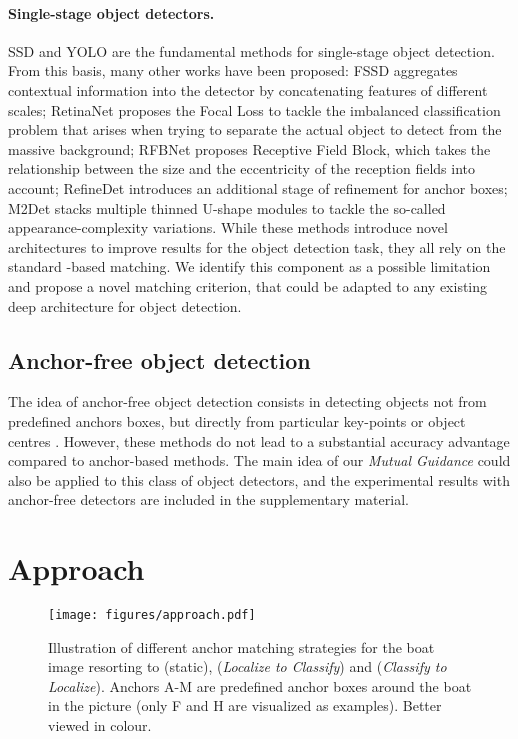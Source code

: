 \documentclass[runningheads]{llncs}
\begin{document}
\paragraph{Single-stage object detectors.}
SSD \cite{SSD} and YOLO \cite{YOLOv1} are the fundamental methods for single-stage object detection. From this basis, many other works have been proposed:
FSSD \cite{FSSD} aggregates contextual information into the detector by concatenating features of different scales;
RetinaNet \cite{RetinaNet} proposes the Focal Loss to tackle the imbalanced classification problem that arises when trying to separate the actual object to detect from the massive background;
RFBNet \cite{RFBNet} proposes Receptive Field Block, which takes the relationship between the size and the eccentricity of the reception fields into account;
RefineDet \cite{RefineDet} introduces an additional stage of refinement for anchor boxes;
M2Det \cite{M2Det} stacks multiple thinned U-shape modules to tackle the so-called appearance-complexity variations.
While these methods introduce novel architectures to improve results for the object detection task, they all rely on the standard -based matching. We identify this component as a possible limitation and propose a novel matching criterion, that could be adapted to any existing deep architecture for object detection.

\subsection{Anchor-free object detection}
The idea of anchor-free object detection consists in detecting objects not from predefined anchors boxes, but directly from particular key-points \cite{CornerNet,CornerNetLite,ExtremeNet,CenterNet2} or object centres \cite{CenterNet,FSAF,FCOS,FoveaBox}. 
However, these methods do not lead to a substantial accuracy advantage compared to anchor-based methods. The main idea of our \emph{Mutual Guidance} could also be applied to this class of object detectors, and the experimental results with anchor-free detectors are included in the supplementary material.

\section{Approach}
\label{sec:approach}

\begin{figure}[t]
\begin{center}
\texttt{[image: figures/approach.pdf]}
\end{center}
   \caption{Illustration of different anchor matching strategies for the boat image resorting to  (static),  (\emph{Localize to Classify}) and  (\emph{Classify to Localize}). Anchors A-M are predefined anchor boxes around the boat in the picture (only F and H are visualized as examples). Better viewed in colour.}
\label{fig:approach}
\end{figure}
\end{document}
